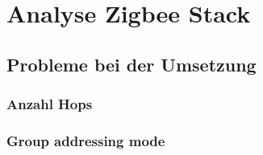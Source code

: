 \clearpage
\section{Analyse Zigbee Stack}\label{sec:AnalyseZigbeeStack}



\subsection{Probleme bei der Umsetzung}\label{subsec:ProblemebeiderUmsetzung}

\subsubsection{Anzahl Hops}\label{subsubsec:AnzahlHops}

\subsubsection{Group addressing mode}\label{subsubsec:Group addressing mode}


